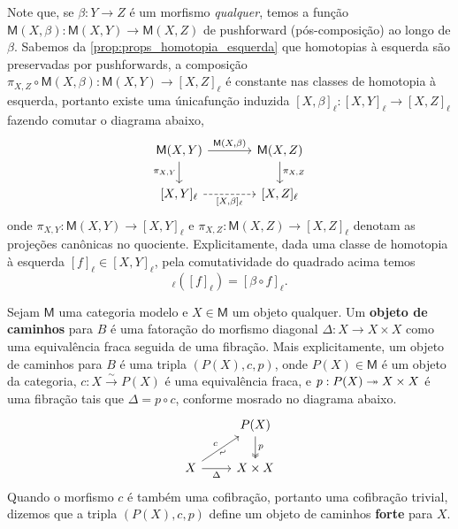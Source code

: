 Note que, se $\beta: Y \to Z$ é um morfismo \emph{qualquer}, temos a função $\mathsf{M}(X,\beta): \mathsf{M}(X,Y) \to \mathsf{M}(X,Z)$ de pushforward (pós-composição) ao longo de $\beta$.
Sabemos da \cref{prop:props_homotopia_esquerda} que homotopias à esquerda são preservadas por pushforwards, a composição $\pi_{X,Z} \circ \mathsf{M}(X,\beta): \mathsf{M}(X,Y) \to [X,Z]_{\ell}$ é constante nas classes de homotopia à esquerda, portanto existe uma únicafunção induzida $[X,\beta]_{\ell}: [X,Y]_{\ell} \to [X,Z]_{\ell}$ fazendo comutar o diagrama abaixo,
\begin{displaymath}
  \begin{tikzcd}[column sep=1.25cm]
    \mathsf{M}(X,Y)
    \arrow[r, "{\mathsf{M}(X,\beta)}"]
    \arrow[d, "{\pi_{X,Y}}" swap]
    & \mathsf{M}(X,Z)
    \arrow[d, "{\pi_{X,Z}}"]
    \\ {[X,Y]_{\ell}}
    \arrow[r, dashed, "{[X,\beta]_{\ell}}" swap]
    & {[X,Z]_{\ell}}
  \end{tikzcd}
\end{displaymath}
onde $\pi_{X,Y}: \mathsf{M}(X,Y) \to [X,Y]_{\ell}$ e $\pi_{X,Z}: \mathsf{M}(X,Z) \to [X,Z]_{\ell}$ denotam as projeções canônicas no quociente.
Explicitamente, dada uma classe de homotopia à esquerda $[f]_{\ell} \in [X,Y]_{\ell}$, pela comutatividade do quadrado acima temos
\begin{displaymath}
  [X,\beta]_{\ell}([f]_{\ell}) = [\beta \circ f]_{\ell}.
\end{displaymath}

\begin{defin}\label{defin:obj_de_caminhos}
  Sejam $\mathsf{M}$ uma categoria modelo e $X \in \mathsf{M}$ um objeto qualquer.
  Um \textbf{objeto de caminhos} para $B$ é uma fatoração do morfismo diagonal $\Delta: X \to X \times X$ como uma equivalência fraca seguida de uma fibração.
  Mais explicitamente, um objeto de caminhos para $B$ é uma tripla $(P(X),c,p)$, onde $P(X) \in \mathsf{M}$ é um objeto da categoria, $c: X \overset{\sim}{\to} P(X)$ é uma equivalência fraca, e $p: P(X) \twoheadrightarrow X \times X$ é uma fibração tais que $\Delta = p \circ c$, conforme mosrado no diagrama abaixo.
  \begin{displaymath}
    \begin{tikzcd}
      & P(X)
      \arrow[d, two heads, "p"]
      \\ X
      \arrow[ru, "c", "\sim" {swap,sloped}]
      \arrow[r, "\Delta" swap]
      & X \times X
    \end{tikzcd}
  \end{displaymath}
  Quando o morfismo $c$ é também uma cofibração, portanto uma cofibração trivial, dizemos que a tripla $(P(X),c,p)$ define um objeto de caminhos \textbf{forte} para $X$.
\end{defin}

